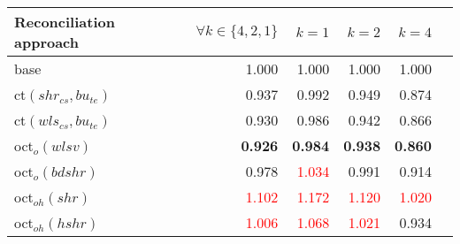 \begin{tabular}[t]{lrrrrr}
 \toprule
  \textbf{Reconciliation approach}  & \textbf{$\forall k \in \{4,2,1\}$}  & \textbf{$k = 1$} & \textbf{$k=2$} & \textbf{$k=4$} \\
  \midrule
  base                     &\cellcolor{LightOrange!30}  {1.000}                 & \cellcolor{LightOrange!30} {1.000}                 & \cellcolor{LightOrange!30} {1.000}                 &\cellcolor{LightOrange!30} {1.000} \\
  ct$(shr_{cs}, bu_{te})$  & {0.937}                 & {0.992}                 & {0.949}                 & {0.874}\\
  ct$(wls_{cs}, bu_{te})$  & {0.930}                 & {0.986}                 & {0.942}                 & {0.866}\\
  oct$_o(wlsv)$            & {\textbf{0.926}}        & {\textbf{0.984}}        & {\textbf{0.938}}        & {\textbf{0.860}} \\
  oct$_o(bdshr)$           & {0.978}                 & \textcolor{red}{1.034}  & {0.991}                 & {0.914} \\
  oct$_{oh}(shr)$          & \textcolor{red}{1.102}  & \textcolor{red}{1.172}  & \textcolor{red}{1.120}  & \textcolor{red}{1.020} \\
  oct$_{oh}(hshr)$         & \textcolor{red}{1.006}  & \textcolor{red}{1.068}  & \textcolor{red}{1.021}  & {0.934} \\
  \bottomrule
  \end{tabular}
